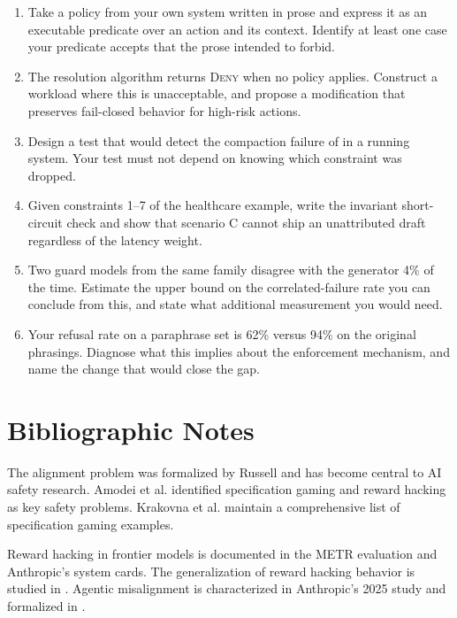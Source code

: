 \begin{enumerate}
\item Take a policy from your own system written in prose and express it as an
executable predicate over an action and its context. Identify at least one case
your predicate accepts that the prose intended to forbid.

\item The resolution algorithm returns \textsc{Deny} when no policy applies.
Construct a workload where this is unacceptable, and propose a modification that
preserves fail-closed behavior for high-risk actions.

\item Design a test that would detect the compaction failure of
\cite{govdecay2026} in a running system. Your test must not depend on knowing
which constraint was dropped.

\item Given constraints 1--7 of the healthcare example, write the invariant
short-circuit check and show that scenario C cannot ship an unattributed draft
regardless of the latency weight.

\item Two guard models from the same family disagree with the generator 4\% of the
time. Estimate the upper bound on the correlated-failure rate you can conclude
from this, and state what additional measurement you would need.

\item Your refusal rate on a paraphrase set is 62\% versus 94\% on the original
phrasings. Diagnose what this implies about the enforcement mechanism, and name
the change that would close the gap.
\end{enumerate}

\section*{Bibliographic Notes}

The alignment problem was formalized by Russell \cite{russell2019} and has become central to AI safety research. Amodei et al. \cite{amodei2016} identified specification gaming and reward hacking as key safety problems. Krakovna et al. \cite{krakovna2020} maintain a comprehensive list of specification gaming examples.

Reward hacking in frontier models is documented in the METR evaluation \cite{metr2025} and Anthropic's system cards. The generalization of reward hacking behavior is studied in \cite{rewardhackgen2024}. Agentic misalignment is characterized in Anthropic's 2025 study \cite{anthropicmisalign2025} and formalized in \cite{agenticmisalign2025}.

